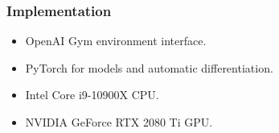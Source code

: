 \begin{frame}
    \frametitle{Implementation}

    \begin{itemize}
        \item OpenAI Gym environment interface.
        \item PyTorch for models and automatic differentiation.
        \item Intel Core i9-10900X CPU.
        \item NVIDIA GeForce RTX 2080 Ti GPU.
    \end{itemize}
\end{frame}